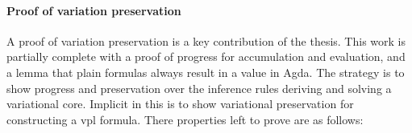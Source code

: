 \paragraph{Proof of variation preservation}
A proof of variation preservation is a key contribution of the thesis. This work
is partially complete with a proof of progress for accumulation and evaluation,
and a lemma that plain formulas always result in a \unit{} value in Agda. The
strategy is to show progress and preservation over the inference rules deriving
and solving a variational core. Implicit in this is to show variational
preservation for constructing a \ac{vpl} formula. There properties left to prove
are as follows:
\begin{enumerate}


\end{enumerate}
